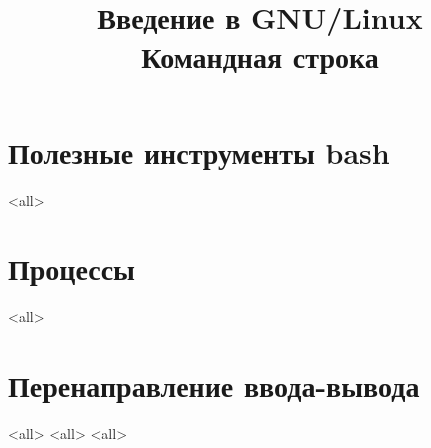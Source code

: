
\title{Введение в GNU/Linux\\Командная строка}


\begin{frame}
 \frametitle{}
 \titlepage
\end{frame}
\section{Полезные инструменты bash}
\mode<all>{}

\section{Процессы}
\mode<all>{}

\section{Перенаправление ввода-вывода}
\mode<all>{}
\mode<all>{}
\mode<all>{}


